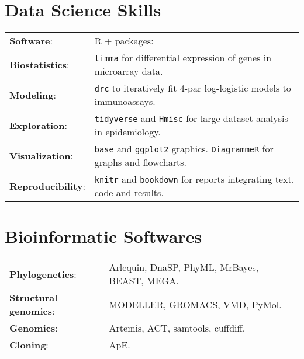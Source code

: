 \documentclass[margin,line]{res}
\begin{document}
\begin{resume}
\section{\sc Data Science Skills}%
\begin{tabular}{ l l }
	{\bf Software}: &  R + packages:\\ %
	{\bf Biostatistics}: & \texttt{limma} for differential expression of genes in microarray data.\\ 
	{\bf Modeling}: & \texttt{drc} to iteratively fit 4-par log-logistic models to immunoassays.\\
	{\bf Exploration}: & \texttt{tidyverse} and \texttt{Hmisc} for large dataset analysis in epidemiology.\\
	{\bf Visualization}: & \texttt{base} and \texttt{ggplot2} graphics. \texttt{DiagrammeR} for graphs and flowcharts.\\ 
	{\bf Reproducibility}: & \texttt{knitr} and \texttt{bookdown} for reports integrating text, code and results.
\end{tabular}


\section{\sc Bioinformatic Softwares}
\begin{tabular}{l l}
	{\bf Phylogenetics}: & Arlequin, DnaSP, PhyML, MrBayes, BEAST, MEGA.\\
	{\bf Structural genomics}: & MODELLER, GROMACS, VMD, PyMol.\\
	{\bf Genomics}: & Artemis, ACT, samtools, cuffdiff.\\
	{\bf Cloning}: & ApE.%
\end{tabular}


\end{resume}
\end{document}
